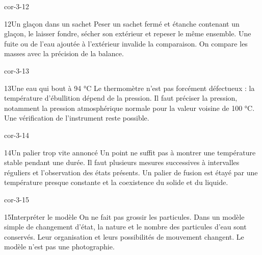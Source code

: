 \documentclass[12pt,twoside,openany]{book}
\begin{document}
\begin{blocLivre}{cor-3-12}
\begin{corrige}{12}{Un glaçon dans un sachet}
Peser un sachet fermé et étanche contenant un glaçon, le laisser fondre, sécher son extérieur et repeser le même ensemble. Une fuite ou de l’eau ajoutée à l’extérieur invalide la comparaison. On compare les masses avec la précision de la balance.\par
\end{corrige}\end{blocLivre}
\begin{blocLivre}{cor-3-13}
\begin{corrige}{13}{Une eau qui bout à 94 °C}
Le thermomètre n’est pas forcément défectueux : la température d’ébullition dépend de la pression. Il faut préciser la pression, notamment la pression atmosphérique normale pour la valeur voisine de 100 °C. Une vérification de l’instrument reste possible.\par
\end{corrige}\end{blocLivre}
\begin{blocLivre}{cor-3-14}
\begin{corrige}{14}{Un palier trop vite annoncé}
Un point ne suffit pas à montrer une température stable pendant une durée. Il faut plusieurs mesures successives à intervalles réguliers et l’observation des états présents. Un palier de fusion est étayé par une température presque constante et la coexistence du solide et du liquide.\par
\end{corrige}\end{blocLivre}
\begin{blocLivre}{cor-3-15}
\begin{corrige}{15}{Interpréter le modèle}
On ne fait pas grossir les particules. Dans un modèle simple de changement d’état, la nature et le nombre des particules d’eau sont conservés. Leur organisation et leurs possibilités de mouvement changent. Le modèle n’est pas une photographie.\par
{}
\end{corrige}\end{blocLivre}
\label{solutions-3}
\end{document}
